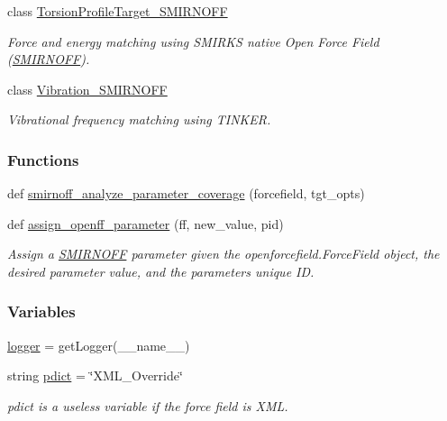 \begin{DoxyCompactItemize}
class \hyperlink{classsrc_1_1smirnoffio_1_1TorsionProfileTarget__SMIRNOFF}{Torsion\+Profile\+Target\+\_\+\+S\+M\+I\+R\+N\+O\+FF}
\begin{DoxyCompactList}\small\item\em Force and energy matching using S\+M\+I\+R\+KS native Open Force Field (\hyperlink{classsrc_1_1smirnoffio_1_1SMIRNOFF}{S\+M\+I\+R\+N\+O\+FF}). \end{DoxyCompactList}\item 
class \hyperlink{classsrc_1_1smirnoffio_1_1Vibration__SMIRNOFF}{Vibration\+\_\+\+S\+M\+I\+R\+N\+O\+FF}
\begin{DoxyCompactList}\small\item\em Vibrational frequency matching using T\+I\+N\+K\+ER. \end{DoxyCompactList}\end{DoxyCompactItemize}
\subsubsection*{Functions}
\begin{DoxyCompactItemize}
\item 
def \hyperlink{namespacesrc_1_1smirnoffio_a993b4343db1c9de5ef6358de38bc6493}{smirnoff\+\_\+analyze\+\_\+parameter\+\_\+coverage} (forcefield, tgt\+\_\+opts)
\item 
def \hyperlink{namespacesrc_1_1smirnoffio_aa6131a8e15712415535410609a0c9900}{assign\+\_\+openff\+\_\+parameter} (ff, new\+\_\+value, pid)
\begin{DoxyCompactList}\small\item\em Assign a \hyperlink{classsrc_1_1smirnoffio_1_1SMIRNOFF}{S\+M\+I\+R\+N\+O\+FF} parameter given the openforcefield.\+Force\+Field object, the desired parameter value, and the parameter\textquotesingle{}s unique ID. \end{DoxyCompactList}\end{DoxyCompactItemize}
\subsubsection*{Variables}
\begin{DoxyCompactItemize}
\item 
\hyperlink{namespacesrc_1_1smirnoffio_a1515611165a2fddb1dd339b81aa5ce66}{logger} = get\+Logger(\+\_\+\+\_\+name\+\_\+\+\_\+)
\item 
string \hyperlink{namespacesrc_1_1smirnoffio_a505ffb180d62c1a425d1a1feadc4e290}{pdict} = \char`\"{}X\+M\+L\+\_\+\+Override\char`\"{}
\begin{DoxyCompactList}\small\item\em pdict is a useless variable if the force field is X\+ML. \end{DoxyCompactList}\end{DoxyCompactItemize}


